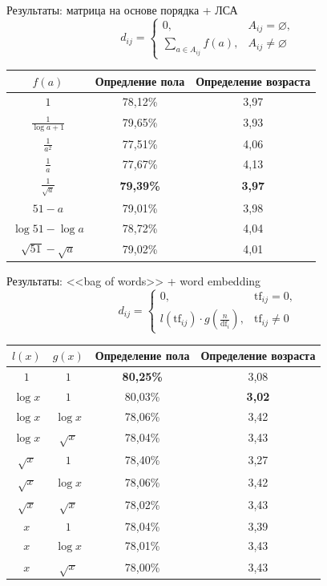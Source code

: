 \documentclass{beamer}
\begin{document}
\begin{frame}{Результаты: матрица на основе порядка + ЛСА}
    \[d_{ij} = \begin{cases}
              0,& A_{ij} = \varnothing,\\
              \sum\limits_{a \in A_{ij}}{f(a)},& A_{ij} \ne \varnothing
          \end{cases}\]
    \begin{table}[h!]
    \centering
    \begin{tabular}{|c|c|c|}
    \hline
    \boldmath$f(a)$ & \textbf{Опредление пола} & \textbf{Определение возраста} \tabularnewline
    \hline
    $1$ & 78,12\% & 3,97 \tabularnewline
    \hline
    $\frac{1}{\log{a + 1}}$ & 79,65\% & 3,93 \tabularnewline
    \hline
    $\frac{1}{a^2}$ & 77,51\% & 4,06 \tabularnewline
    \hline
    $\frac{1}{a}$ & 77,67\% & 4,13 \tabularnewline
    \hline
    $\frac{1}{\sqrt{a}}$ & \textbf{79,39\%} & \textbf{3,97} \tabularnewline
    \hline
    $51 - a$ & 79,01\% & 3,98 \tabularnewline
    \hline
    $\log{51} - \log{a}$ & 78,72\% & 4,04 \tabularnewline
    \hline
    $\sqrt{51} - \sqrt{a}$ & 79,02\% & 4,01 \tabularnewline
    \hline
    \end{tabular}
    \label{tab:order_lsa}
    \end{table}
\end{frame}

\begin{frame}{Результаты: <<bag of words>> + word embedding}
    \[d_{ij} = \begin{cases}
              0,& \mathrm{tf}_{ij} = 0,\\
              l(\mathrm{tf}_{ij}) \cdot g(\frac{n}{\mathrm{df}_{i}}),& \mathrm{tf}_{ij} \ne 0
        \end{cases}\]
    \begin{table}[h!]
    \centering
    \begin{tabular}{|c|c|c|c|}
    \hline
    \boldmath$l(x)$ & \boldmath$g(x)$ & \textbf{Определение пола} & \textbf{Определение возраста} \tabularnewline
    \hline
    $1$ & $1$ & \textbf{80,25\%} & 3,08 \tabularnewline
    \hline
    $\log{x}$ & $1$ & 80,03\% & \textbf{3,02} \tabularnewline
    \hline
    $\log{x}$ & $\log{x}$ & 78,06\% & 3,42 \tabularnewline
    \hline
    $\log{x}$ & $\sqrt{x}$ & 78,04\% & 3,43 \tabularnewline
    \hline
    $\sqrt{x}$ & $1$ & 78,40\% & 3,27 \tabularnewline
    \hline
    $\sqrt{x}$ & $\log{x}$ & 78,06\% & 3,42 \tabularnewline
    \hline
    $\sqrt{x}$ & $\sqrt{x}$ & 78,02\% & 3,43 \tabularnewline
    \hline
    $x$ & $1$ & 78,04\% & 3,39 \tabularnewline
    \hline
    $x$ & $\log{x}$ & 78,01\% & 3,43 \tabularnewline
    \hline
    $x$ & $\sqrt{x}$ & 78,00\% & 3,43 \tabularnewline
    \hline
    \end{tabular}
    \label{tab:bagofwords_wordembedding}
    \end{table}
\end{frame}
\end{document}
